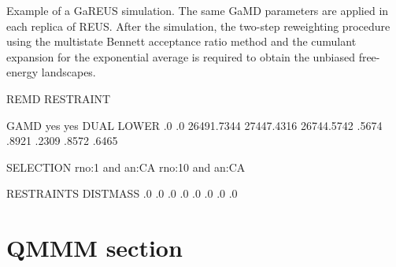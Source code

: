 \documentclass[a4paper,11pt,oneside,english]{sphinxmanual}
\begin{document}
Example of a GaREUS simulation.
The same GaMD parameters are applied in each replica of REUS.
After the simulation, the two-step reweighting procedure using the
multistate Bennett acceptance ratio method and the cumulant expansion
for the exponential average is required to obtain the unbiased free-energy landscapes.

\begin{sphinxVerbatim}[commandchars=\\\{\}]
\PYG{o}{[}REMD\PYG{o}{]}
         
   
             RESTRAINT
         
    

\PYG{o}{[}GAMD\PYG{o}{]}
           yes
          yes
     DUAL
    LOWER
     .0
     .0
  
        \PYGZhy{}26491.7344
        \PYGZhy{}27447.4316
        \PYGZhy{}26744.5742
        .5674
        .8921
        .2309
        .8572
        .6465

\PYG{o}{[}SELECTION\PYG{o}{]}
  rno:1  and an:CA
  rno:10 and an:CA

\PYG{o}{[}RESTRAINTS\PYG{o}{]}
     
      DISTMASS
      .0 .0 .0 .0
     .0 .0 .0 .0
   
\end{sphinxVerbatim}


\chapter{QMMM section}
\label{\detokenize{17_QMMM:qmmm-section}}\label{\detokenize{17_QMMM:qmmm}}\label{\detokenize{17_QMMM::doc}}
\end{document}
